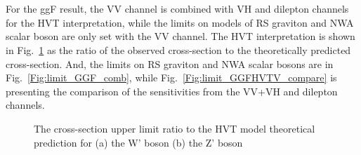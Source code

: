 \noindent
\\
\\For the ggF result, the VV channel is combined with VH and dilepton channels for the HVT interpretation, while the limits on models of RS graviton and NWA scalar boson are only set with the VV channel. The HVT interpretation is shown in Fig.~\ref{Fig:limit_GGFHVT_comb} as the ratio of the observed cross-section to the theoretically predicted cross-section. And, the limits on RS graviton and NWA scalar bosons are in Fig.~\ref{Fig:limit_GGF_comb}, while Fig.~\ref{Fig:limit_GGFHVTV_compare} is presenting the comparison of the sensitivities from the VV+VH and dilepton channels. 
\begin{figure}[ht]
	\centering
	\caption{The cross-section upper limit ratio to the HVT model theoretical prediction for (a) the W' boson (b) the Z' boson }
	\label{Fig:limit_GGFHVT_comb}
\end{figure}
